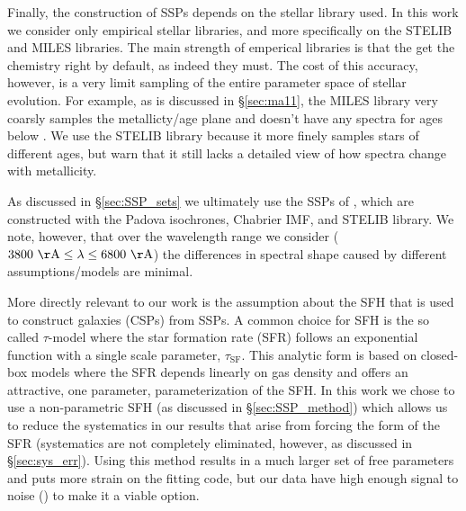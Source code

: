 Finally, the construction of SSPs depends on the stellar library
used. In this work we consider only empirical stellar libraries, and
more specifically on the STELIB \citep{LeBorgne03} and MILES
\citep{Sanchez-Blazquez06} libraries. The main strength of emperical
libraries is that the get the chemistry right by default, as indeed
they must. The cost of this accuracy, however, is a very limit
sampling of the entire parameter space of stellar evolution. For
example, as is discussed in \S\ref{sec:ma11}, the MILES library very
coarsly samples the metallicty/age plane and doesn't have any spectra
for ages below . We use the STELIB library because it
more finely samples stars of different ages, but warn that it still
lacks a detailed view of how spectra change with metallicity.

As discussed in \S\ref{sec:SSP_sets} we ultimately use the SSPs of
\citet{Bruzual03}, which are constructed with the Padova isochrones,
Chabrier IMF, and STELIB library. We note, however, that over the
wavelength range we consider ($\val{3800}{\AA} \leq\lambda\leq
\val{6800}{\AA}$) the differences in spectral shape caused by
different assumptions/models are minimal.

More directly relevant to our work is the assumption about the SFH
that is used to construct galaxies (CSPs) from SSPs. A common choice
for SFH is the so called $\tau$-model where the star formation rate
(SFR) follows an exponential function with a single scale parameter,
$\tau_\mathrm{SF}$. This analytic form is based on closed-box models
where the SFR depends linearly on gas density \citep{Schmidt59} and
offers an attractive, one parameter, parameterization of the SFH. In
this work we chose to use a non-parametric SFH (as discussed in
\S\ref{sec:SSP_method}) which allows us to reduce the systematics in
our results that arise from forcing the form of the SFR (systematics
are not completely eliminated, however, as discussed in
\S\ref{sec:sys_err}). Using this method results in a much larger set
of free parameters and puts more strain on the fitting code, but our
data have high enough signal to noise () to
make it a viable option.

